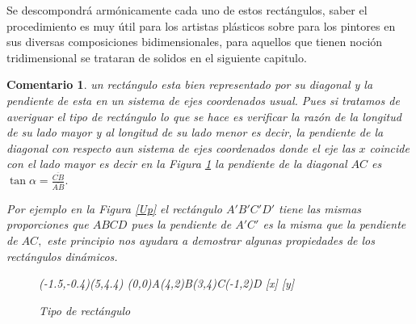 \documentclass[a4paper]{book}
\newtheorem{comen}{Comentario}[chapter]
\begin{document}
Se descompondrá armónicamente cada uno de estos rectángulos, saber el procedimiento es muy útil para los artistas plásticos sobre para los pintores en sus diversas composiciones bidimensionales, para aquellos que tienen noción tridimensional  se trataran de solidos en el siguiente capitulo.

\begin{comen}\label{com1} un rectángulo esta bien representado por su diagonal y la pendiente de esta en un sistema de ejes coordenados usual. Pues si tratamos de averiguar el tipo de rectángulo  lo que se hace es verificar  la razón de la longitud de su lado mayor y al longitud de su lado menor es decir, la pendiente de la diagonal con respecto aun sistema de ejes coordenados donde el eje las $x$ coincide con el lado mayor es decir en la Figura \ref{Op} la pendiente de la diagonal $AC$ es $\tan{\alpha}=\frac{\overline{CB}}{\overline{AB}}.$

	Por ejemplo en la Figura \ref{Up} el rectángulo $A'B'C'D'$ tiene las mismas proporciones que $ABCD$ pues la pendiente de $A'C'$ es la misma que la pendiente de $AC,$ este principio nos ayudara a demostrar algunas propiedades de los rectángulos dinámicos.
	\begin{figure}[!ht]
		\begin{center}
			\begin{pspicture}(-1.5,-0.4)(5,4.4)
				\pstGeonode[CurveType=polygon,unit=1,PosAngle={-110,-90,90,-115}](0,0){A}(4,2){B}(3,4){C}(-1,2){D}
				[x]
				[y]
			\end{pspicture}
		\end{center}
		\caption{Tipo de rectángulo}\label{Op}
	\end{figure}


\end{comen}
\end{document}
